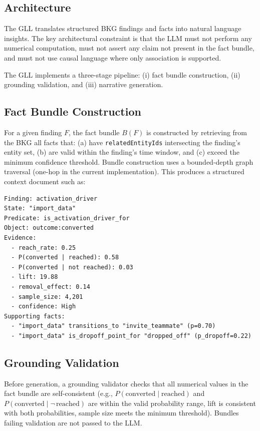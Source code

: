 \documentclass[12pt, a4paper]{article}
\begin{document}
\subsection{Architecture}

The GLL translates structured BKG findings and facts into natural language insights. The key architectural constraint is that the LLM must not perform any numerical computation, must not assert any claim not present in the fact bundle, and must not use causal language where only association is supported.

The GLL implements a three-stage pipeline: (i) fact bundle construction, (ii) grounding validation, and (iii) narrative generation.

\subsection{Fact Bundle Construction}

For a given finding $F$, the fact bundle $B(F)$ is constructed by retrieving from the BKG all facts that: (a) have \texttt{relatedEntityIds} intersecting the finding's entity set, (b) are valid within the finding's time window, and (c) exceed the minimum confidence threshold. Bundle construction uses a bounded-depth graph traversal (one-hop in the current implementation). This produces a structured context document such as:

\begin{minipage}{\linewidth}
\begin{lstlisting}
Finding: activation_driver
State: "import_data"
Predicate: is_activation_driver_for
Object: outcome:converted
Evidence:
  - reach_rate: 0.25
  - P(converted | reached): 0.58
  - P(converted | not reached): 0.03
  - lift: 19.88
  - removal_effect: 0.14
  - sample_size: 4,201
  - confidence: High
Supporting facts:
  - "import_data" transitions_to "invite_teammate" (p=0.70)
  - "import_data" is_dropoff_point_for "dropped_off" (p_dropoff=0.22)
\end{lstlisting}
\end{minipage}

\subsection{Grounding Validation}

Before generation, a grounding validator checks that all numerical values in the fact bundle are self-consistent (e.g., $P(\text{converted} \mid \text{reached})$ and $P(\text{converted} \mid \neg\,\text{reached})$ are within the valid probability range, lift is consistent with both probabilities, sample size meets the minimum threshold). Bundles failing validation are not passed to the LLM.
\end{document}
